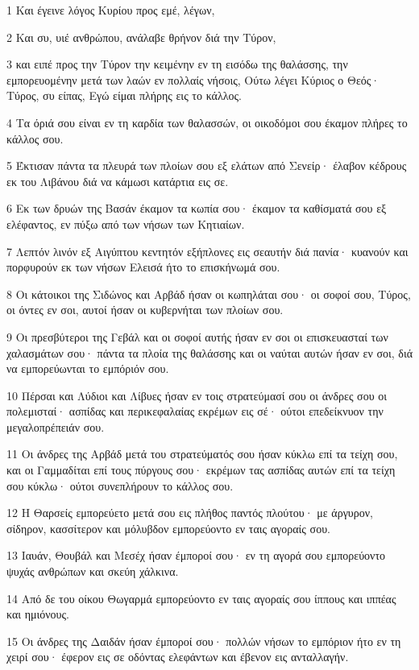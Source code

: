 \par 1 Και έγεινε λόγος Κυρίου προς εμέ, λέγων,
\par 2 Και συ, υιέ ανθρώπου, ανάλαβε θρήνον διά την Τύρον,
\par 3 και ειπέ προς την Τύρον την κειμένην εν τη εισόδω της θαλάσσης, την εμπορευομένην μετά των λαών εν πολλαίς νήσοις, Ούτω λέγει Κύριος ο Θεός· Τύρος, συ είπας, Εγώ είμαι πλήρης εις το κάλλος.
\par 4 Τα όριά σου είναι εν τη καρδία των θαλασσών, οι οικοδόμοι σου έκαμον πλήρες το κάλλος σου.
\par 5 Έκτισαν πάντα τα πλευρά των πλοίων σου εξ ελάτων από Σενείρ· έλαβον κέδρους εκ του Λιβάνου διά να κάμωσι κατάρτια εις σε.
\par 6 Εκ των δρυών της Βασάν έκαμον τα κωπία σου· έκαμον τα καθίσματά σου εξ ελέφαντος, εν πύξω από των νήσων των Κητιαίων.
\par 7 Λεπτόν λινόν εξ Αιγύπτου κεντητόν εξήπλονες εις σεαυτήν διά πανία· κυανούν και πορφυρούν εκ των νήσων Ελεισά ήτο το επισκήνωμά σου.
\par 8 Οι κάτοικοι της Σιδώνος και Αρβάδ ήσαν οι κωπηλάται σου· οι σοφοί σου, Τύρος, οι όντες εν σοι, αυτοί ήσαν οι κυβερνήται των πλοίων σου.
\par 9 Οι πρεσβύτεροι της Γεβάλ και οι σοφοί αυτής ήσαν εν σοι οι επισκευασταί των χαλασμάτων σου· πάντα τα πλοία της θαλάσσης και οι ναύται αυτών ήσαν εν σοι, διά να εμπορεύωνται το εμπόριόν σου.
\par 10 Πέρσαι και Λύδιοι και Λίβυες ήσαν εν τοις στρατεύμασί σου οι άνδρες σου οι πολεμισταί· ασπίδας και περικεφαλαίας εκρέμων εις σέ· ούτοι επεδείκνυον την μεγαλοπρέπειάν σου.
\par 11 Οι άνδρες της Αρβάδ μετά του στρατεύματός σου ήσαν κύκλω επί τα τείχη σου, και οι Γαμμαδίται επί τους πύργους σου· εκρέμων τας ασπίδας αυτών επί τα τείχη σου κύκλω· ούτοι συνεπλήρουν το κάλλος σου.
\par 12 Η Θαρσείς εμπορεύετο μετά σου εις πλήθος παντός πλούτου· με άργυρον, σίδηρον, κασσίτερον και μόλυβδον εμπορεύοντο εν ταις αγοραίς σου.
\par 13 Ιαυάν, Θουβάλ και Μεσέχ ήσαν έμποροί σου· εν τη αγορά σου εμπορεύοντο ψυχάς ανθρώπων και σκεύη χάλκινα.
\par 14 Από δε του οίκου Θωγαρμά εμπορεύοντο εν ταις αγοραίς σου ίππους και ιππέας και ημιόνους.
\par 15 Οι άνδρες της Δαιδάν ήσαν έμποροί σου· πολλών νήσων το εμπόριον ήτο εν τη χειρί σου· έφερον εις σε οδόντας ελεφάντων και έβενον εις ανταλλαγήν.
